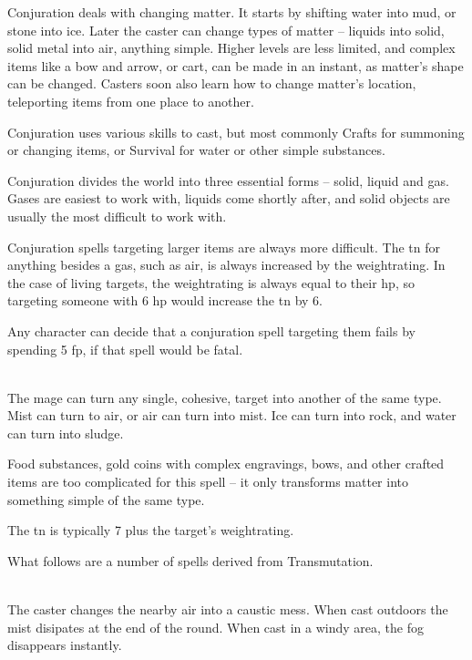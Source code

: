 
\begin{multicols}{2}

\noindent
Conjuration deals with changing matter.
It starts by shifting water into mud, or stone into ice.  Later the caster can change types of matter -- liquids into solid, solid metal into air, anything simple.
Higher levels are less limited, and complex items like a bow and arrow, or cart, can be made in an instant, as matter's shape can be changed.  Casters soon also learn how to change matter's location, teleporting items from one place to another.

Conjuration uses various skills to cast, but most commonly Crafts for summoning or changing items, or Survival for water or other simple substances.

Conjuration divides the world into three essential forms -- solid, liquid and gas.  Gases are easiest to work with, liquids come shortly after, and solid objects are usually the most difficult to work with.

Conjuration spells targeting larger items are always more difficult.  The \gls{tn} for anything besides a gas, such as air, is always increased by the \gls{weightrating}.
In the case of living targets, the \gls{weightrating} is always equal to their \gls{hp}, so targeting someone with 6 \gls{hp} would increase the \gls{tn} by 6.

Any character can decide that a conjuration spell targeting them fails by spending 5 \gls{fp}, if that spell would be fatal.

\spelllevel

\\
The mage can turn any single, cohesive, target into another of the same type.  Mist can turn to air, or air can turn into mist.
Ice can turn into rock, and water can turn into sludge.

Food substances, gold coins with complex engravings, bows, and other crafted items are too complicated for this spell -- it only transforms matter into something simple of the same type.

The \gls{tn} is typically 7 plus the target's \gls{weightrating}.

What follows are a number of spells derived from Transmutation.

\\
The caster changes the nearby air into a caustic mess.  When cast outdoors the mist disipates at the end of the \gls{round}.  When cast in a windy area, the fog disappears instantly.


\end{multicols}

